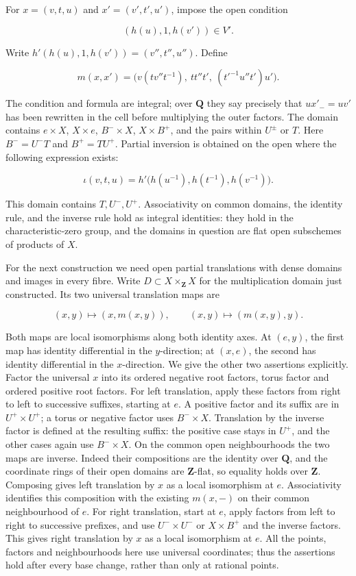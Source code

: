 \documentclass[11pt,a4paper,openany]{report}
\begin{document}
For \(x=(v,t,u)\) and \(x'=(v',t',u')\), impose the open condition

\[
(h(u),1,h(v'))\in V'.
\]

Write \(h'(h(u),1,h(v'))=(v'',t'',u'')\). Define

\[
m(x,x')=
\bigl(v(t v''t^{-1}),\ tt''t',\ (t'^{-1}u''t')u'\bigr).
\tag{7.4}
\]

The condition and formula are integral; over \(\mathbf Q\) they say precisely that \(ux'_{-}=uv'\) has been rewritten in the cell before multiplying the outer factors. The domain contains \(e\times X\), \(X\times e\), \(B^-\times X\), \(X\times B^+\), and the pairs within \(U^\pm\) or \(T\). Here \(B^-=U^-T\) and \(B^+=TU^+\). Partial inversion is obtained on the open where the following expression exists:

\[
\iota(v,t,u)=h'\bigl(h(u^{-1}),h(t^{-1}),h(v^{-1})\bigr).
\tag{7.5}
\]

This domain contains \(T,U^-,U^+\). Associativity on common domains, the identity rule, and the inverse rule hold as integral identities: they hold in the characteristic-zero group, and the domains in question are flat open subschemes of products of \(X\).

For the next construction we need open partial translations with dense domains and images in every fibre. Write \(D\subset X\times_{\mathbf Z}X\) for the multiplication domain just constructed. Its two universal translation maps are

\[
(x,y)\longmapsto(x,m(x,y)),\qquad
(x,y)\longmapsto(m(x,y),y).
\tag{7.6}
\]

Both maps are local isomorphisms along both identity axes. At \((e,y)\), the first map has identity differential in the \(y\)-direction; at \((x,e)\), the second has identity differential in the \(x\)-direction. We give the other two assertions explicitly. Factor the universal \(x\) into its ordered negative root factors, torus factor and ordered positive root factors. For left translation, apply these factors from right to left to successive suffixes, starting at \(e\). A positive factor and its suffix are in \(U^+\times U^+\); a torus or negative factor uses \(B^-\times X\). Translation by the inverse factor is defined at the resulting suffix: the positive case stays in \(U^+\), and the other cases again use \(B^-\times X\). On the common open neighbourhoods the two maps are inverse. Indeed their compositions are the identity over \(\mathbf Q\), and the coordinate rings of their open domains are \(\mathbf Z\)-flat, so equality holds over \(\mathbf Z\). Composing gives left translation by \(x\) as a local isomorphism at \(e\). Associativity identifies this composition with the existing \(m(x,-)\) on their common neighbourhood of \(e\). For right translation, start at \(e\), apply factors from left to right to successive prefixes, and use \(U^-\times U^-\) or \(X\times B^+\) and the inverse factors. This gives right translation by \(x\) as a local isomorphism at \(e\). All the points, factors and neighbourhoods here use universal coordinates; thus the assertions hold after every base change, rather than only at rational points.
\end{document}
